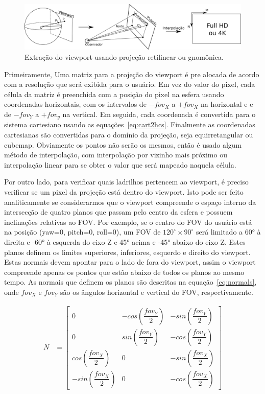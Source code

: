 \begin{figure}[h]
	\centering
	\includegraphics[width=1.0\linewidth]{fig/projecao_viewport.png}
	\caption{Extração do viewport usando projeção retilinear ou gnomônica.}
	\label{fig:projecao_viewport}
\end{figure}

Primeiramente, Uma matriz para a projeção do viewport é pre alocada de acordo com a resolução que será exibida para o usuário. Em vez do valor do pixel, cada célula da matriz é preenchida com a posição do pixel na esfera usando coordenadas horizontais, com os intervalos de $-fov_X$ a $+fov_X$ na horizontal e e de $-fov_Y$ a $+fov_y$ na vertical. Em seguida, cada coordenada é convertida para o sistema cartesiano usando as equações~\ref{eq:cart2hcs}. Finalmente as coordenadas cartesianas são convertidas para o domínio da projeção, seja equirretangular ou cubemap. Obviamente os pontos não serão os mesmos, então é usado algum método de interpolação, com interpolação por vizinho mais próximo ou interpolação linear para se obter o valor que será mapeado naquela célula.

Por outro lado, para verificar quais ladrilhos pertencem ao viewport, é preciso verificar se um pixel da projeção está dentro do viewport. Isto pode ser feito analiticamente se considerarmos que o viewport compreende o espaço interno da intersecção de quatro planos que passam pelo centro da esfera e possuem inclinações relativas ao FOV. Por exemplo, se o centro do FOV do usuário está na posição (yaw=0, pitch=0, roll=0), um FOV de $ 120^\circ\times 90^\circ $ será limitado a 60° à direita e -60° à esquerda do eixo Z e 45° acima e -45° abaixo do eixo Z. Estes planos definem os limites superiores, inferiores, esquerdo e direito do viewport. Estas normais devem apontar para o lado de fora do viewport, assim o viewport compreende apenas os pontos que estão abaixo de todos os planos ao mesmo tempo. As normais que definem os planos são descritas na equação~\ref{eq:normals}, onde $fov_X$ e $fov_Y$ são os ângulos horizontal e vertical do FOV, respectivamente.

\begin{align}
	N &=\begin{bmatrix}
		0 & -cos\left(\dfrac{fov_Y}{2}\right) & -sin\left(\dfrac{fov_Y}{2}\right) \\
		0 & sin\left(\dfrac{fov_Y}{2}\right) & -cos\left(\dfrac{fov_Y}{2}\right) \\
		cos\left(\dfrac{fov_X}{2}\right) & 0 & -sin\left(\dfrac{fov_X}{2}\right)\\
		-sin\left(\dfrac{fov_X}{2}\right) & 0 & -cos\left(\dfrac{fov_X}{2}\right)
	\end{bmatrix}
	\label{eq:normals}
\end{align}

